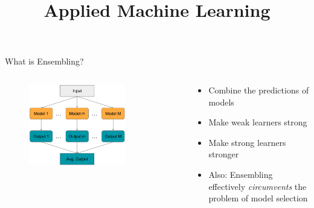 \documentclass[10pt,compress,t,notes=noshow, xcolor=table]{beamer}
\title{Applied Machine Learning}
\date{}
\begin{document}




\begin{vbframe}{What is Ensembling?}

\vfill
\begin{columns}
    \begin{column}{0.5\textwidth}
        \vspace{-1em}
        \begin{figure}
            \centering
            \includegraphics[width=0.75\textwidth]{figure/Ensembling.pdf}
            \label{fig:ensembling}
        \end{figure}
    \end{column}
    \begin{column}{0.5\textwidth}
        \begin{itemize}
            \item Combine the predictions of models
            \item Make weak learners strong
            \item Make strong learners stronger
            \item Also: Ensembling effectively \textit{circumvents} the problem of model selection
        \end{itemize}
    \end{column}
\end{columns}

\end{vbframe}
\end{document}
